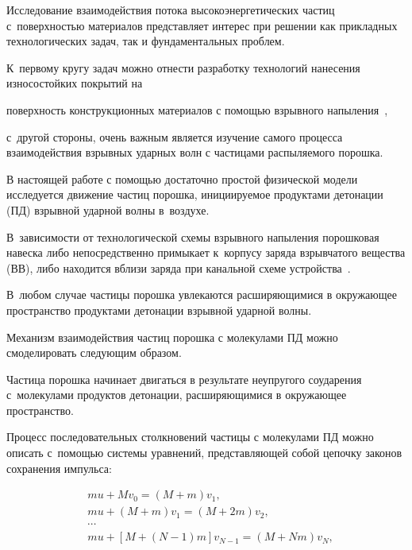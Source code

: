 


\date{19/IV/2013}





\makerutitle





Исследование взаимодействия потока высокоэнергетических частиц с~поверхностью материалов представляет интерес при решении как  прикладных технологических задач, так и фундаментальных проблем. 

К~первому кругу задач можно отнести разработку технологий нанесения износостойких покрытий на

поверхность конструкционных материалов с помощью взрывного напыления~\cite{krest:bib1,krest:bib2},

с~другой стороны, очень важным является изучение самого процесса взаимодействия взрывных ударных волн с частицами распыляемого порошка.



В настоящей работе с помощью достаточно простой физической модели исследуется движение частиц порошка, инициируемое продуктами детонации (ПД) взрывной ударной волны в~воздухе. 

В~зависимости от технологической схемы взрывного напыления порошковая навеска либо непосредственно примыкает к~корпусу заряда взрывчатого вещества (ВВ), либо находится вблизи заряда при канальной схеме устройства~\cite{krest:bib1}. 

В~любом случае частицы порошка увлекаются расширяющимися в окружающее пространство продуктами детонации взрывной ударной волны. 

Механизм взаимодействия частиц порошка с молекулами ПД можно смоделировать следующим образом.



Частица порошка начинает двигаться в результате неупругого соударения с~молекулами продуктов детонации, расширяющимися в окружающее пространство.

Процесс последовательных столкновений частицы с молекулами ПД можно описать с~помощью системы уравнений, представляющей собой цепочку законов сохранения импульса:

\begin{equation}

\label{krest:eq1}

\begin{aligned}

& mu+M v_0 =(M+m) v_1, \\

& mu+(M+m) v_1 =(M+2 m) v_2, \\

& \cdots \\

& m u+[M+(N-1) m]  v_{N-1} =(M+N m) v_N,

\end{aligned}

\end{equation}


